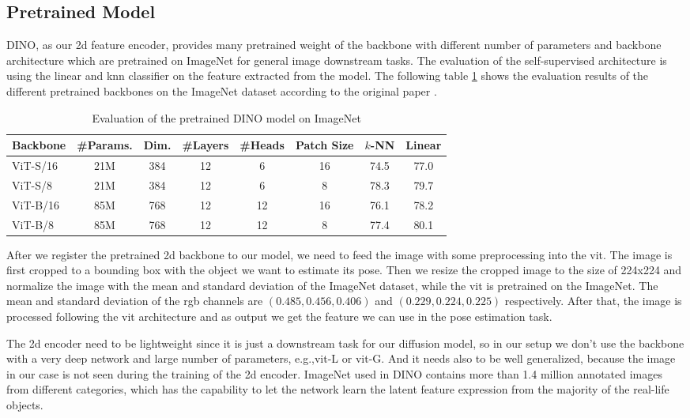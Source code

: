 \documentclass[12pt,DIV14,BCOR12mm,a4paper,footinclude=false,headinclude,parskip=half-,twoside,openright,cleardoublepage=empty,toc=index,bibliography=totoc,listof=totoc]{scrreprt}
\numberwithin{equation}{chapter}
\begin{document}
\subsection{Pretrained Model} 
DINO, as our \gls{2d} feature encoder, provides many pretrained weight of the backbone with different number of parameters and backbone architecture which are pretrained on ImageNet for general image downstream tasks. The evaluation of the self-supervised architecture is using the linear and \gls{knn} classifier on the feature extracted from the model. The following table \ref{tab:dino} shows the evaluation results of the different pretrained backbones on the ImageNet dataset according to the original paper \cite{caron2021emerging}.
\begin{table}[ht]
  \centering
  \caption{Evaluation of the pretrained DINO model on ImageNet}
  \label{tab:dino}
  \begin{tabular}{l | c c c c c c c}
      \toprule
      Backbone & \#Params. & Dim. & \#Layers & \#Heads & Patch Size & $k$-NN & Linear\\
      \midrule
      ViT-S/16 & 21M & 384 & 12 & 6 & 16 & 74.5 & 77.0 \\
      ViT-S/8 & 21M & 384 & 12 & 6 & 8 & 78.3 & 79.7 \\
      ViT-B/16 & 85M & 768 & 12 & 12 & 16 & 76.1 & 78.2 \\
      ViT-B/8 & 85M & 768 & 12 & 12 & 8 & 77.4 & 80.1 \\
      \bottomrule
  \end{tabular}
\end{table}

After we register the pretrained \gls{2d} backbone to our model, we need to feed the image with some preprocessing into the \gls{vit}. The image is first cropped to a bounding box with the object we want to estimate its pose. Then we resize the cropped image to the size of 224x224 and normalize the image with the mean and standard deviation of the ImageNet dataset, while the \gls{vit} is pretrained on the ImageNet. The mean and standard deviation of the \gls{rgb} channels are $(0.485, 0.456, 0.406)$ and $(0.229, 0.224, 0.225)$ respectively. After that, the image is processed following the \gls{vit} architecture and as output we get the feature we can use in the pose estimation task. 

The \gls{2d} encoder need to be lightweight since it is just a downstream task for our diffusion model, so in our setup we don't use the backbone with a very deep network and large number of parameters, e.g.,\gls{vit}-L or \gls{vit}-G. And it needs also to be well generalized, because the image in our case is not seen during the training of the \gls{2d} encoder. ImageNet used in DINO contains more than 1.4 million annotated images from different categories, which has the capability to let the network learn the latent feature expression from the majority of the real-life objects. 
\end{document}

